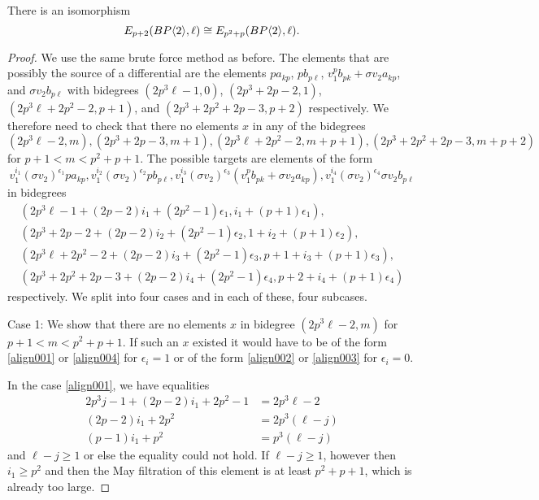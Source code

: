 \begin{lem}
There is an isomorphism 
\[E_{p+2}(BP\langle 2 \rangle,\ell)\cong E_{p^2+p}(BP\langle 2 \rangle,\ell).\]
\end{lem}
\begin{proof}
We use the same brute force method as before. The elements that are possibly the source of a differential are the elements $pa_{kp}$, $pb_{p\ell}$, $v_1^pb_{pk}+\sigma v_2 a_{kp}$, and $\sigma v_2 b_{p\ell}$  with bidegrees $(2p^3\ell-1,0)$, $(2p^3+2p-2,1)$,  $(2p^3\ell+2p^2-2,p+1)$, and $(2p^3+2p^2+2p-3,p+2)$ respectively. We therefore need to check that there no elements $x$ in any of the bidegrees
\[ (2p^3\ell-2,m), (2p^3+2p-3,m+1), (2p^3\ell+2p^2-2,m+p+1), (2p^3+2p^2+2p-3,m+p+2) \]
for $p+1<m<p^2+p+1$. The possible targets are elements of the form 
\[v_1^{i_1}(\sigma v_2)^{\epsilon_1}pa_{kp}, v_1^{i_2}(\sigma v_2)^{\epsilon_2}pb_{p\ell},v_1^{i_3}(\sigma v_2)^{\epsilon_3}(v_1^pb_{pk}+\sigma v_2 a_{kp}), v_1^{i_4}(\sigma v_2)^{\epsilon_4}\sigma v_2 b_{p\ell}\]
 in bidegrees 
 \begin{align}
 \label{align001} (2p^3\ell-1+(2p-2)i_1+(2p^2-1)\epsilon_1 , i_1+(p+1)\epsilon_1), \\  
 \label{align002} (2p^3+2p-2+(2p-2)i_2+(2p^2-1)\epsilon_2,1+i_2+(p+1)\epsilon_2), \\
 \label{align003} (2 p^3\ell+2p^2-2 +(2p-2)i_3+(2p^2-1)\epsilon_3,p+1+i_3+(p+1)\epsilon_3),\\ 
 \label{align004} (2p^3+2p^2+2p-3+(2p-2)i_4+(2p^2-1)\epsilon_4,p+2+i_4+(p+1)\epsilon_4)
  \end{align}
 respectively. We split into four cases and in each of these, four subcases. 
 
 Case 1: We show that there are no elements  $x$ in bidegree $(2p^3\ell-2,m)$ for $p+1<m<p^2+p+1$. If such an $x$ existed it would have to be of the form  \eqref{align001} or  \eqref{align004} for $\epsilon_i=1$ or  of the form \eqref{align002} or  \eqref{align003} for $\epsilon_i=0$. 
 
 
In the case \eqref{align001}, we have equalities
\begin{align*}
2p^3j-1+(2p-2)i_1+2p^2-1&=2p^3\ell-2  \\
(2p-2)i_1+2p^2 & = 2p^3(\ell-j) \\
(p-1)i_1+p^2& =p^3(\ell-j) 
\end{align*}
and $\ell-j\ge 1$ or else the equality could not hold. If $\ell-j\ge1$, however then $i_1\ge p^2$ and then the May filtration of this element is at least $p^2+p+1$, which is already too large. 


\end{proof}
